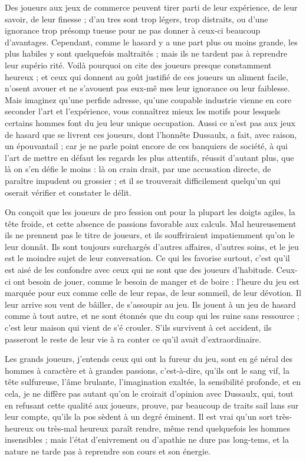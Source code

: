 Des joueurs aux jeux de commerce
peuvent tirer parti de leur expérience,
de leur savoir, de leur finesse ; d'au%
tres sont trop légers, trop distraits,
ou d'une ignorance trop présomp%
tueuse pour ne pas donner à ceux-ci
beaucoup d'avantages. Cependant,
comme le hasard y a une part plus ou
moins grande, les plus habiles y sont
quelquefois maltraités ; mais ils ne
tardent pas à reprendre leur supério%
rité. Voilà pourquoi on cite des joueurs
presque constamment heureux ; et
ceux qui donnent au goût justifié de
ces joueurs un aliment facile, n'osent
avouer et ne s'avouent pas eux-mê%
mes leur ignorance ou leur faiblesse.
Mais imaginez qu'une perfide adresse,
qu'une coupable industrie vienne en%
core seconder l'art et l'expérience,
vous connaîtrez mieux les motifs pour
lesquels certains hommes font du jeu
leur unique occupation. Aussi ce n'est
pas aux jeux de hasard que se livrent
ces joueurs, dont l'honnête Dussaulx,
a fait, avec raison, un épouvantail ;
car je ne parle point encore de ces
banquiers de société, à qui l'art de
mettre en défaut les regards les plus
attentifs, réussit d'autant plus, que
là on s'en défie le moins : là on crain%
drait, par une accusation directe, de
paraître impudent ou grossier ; et il se
trouverait difficilement quelqu'un qui
oserait vérifier et constater le délit.

On conçoit que les joueurs de pro%
fession ont pour la plupart les doigts
agiles, la tête froide, et cette absence
de passions favorable aux calculs. Mal%
heureusement ils ne prennent pas le
titre de joueurs, et ils souffriraient
impatiemment qu'on le leur donnât.
Ils sont toujours surchargés d'autres
affaires, d'autres soins, et le jeu est
le moindre sujet de leur conversation.
Ce qui les favorise surtout, c'est qu'il
est aisé de les confondre avec ceux qui
ne sont que des joueurs d'habitude.
Ceux-ci ont besoin de jouer, comme le
besoin de manger et de boire : l'heure
du jeu est marquée pour eux comme
celle de leur repas, de leur sommeil,
de leur dévotion. Il leur arrive sou%
vent de bâiller, de s'assoupir au jeu.
Ils jouent à un jeu de hasard comme
à tout autre, et ne sont étonnés que
du coup qui les ruine sans ressource ;
c'est leur maison qui vient de s'é%
crouler. S'ils survivent à cet accident,
ils passeront le reste de leur vie à ra%
conter ce qu'il avait d'extraordinaire.

Les grands joueurs, j'entends ceux
qui ont la fureur du jeu, sont en gé%
néral des hommes à caractère et à
grandes passions, c'est-à-dire, qu'ils
ont le sang vif, la tête sulfureuse,
l'âme brulante, l'imagination exaltée,
la sensibilité profonde, et en cela, je
ne diffère pas autant qu'on le croirait
d'opinion avec Dussaulx, qui, tout
en refusant cette qualité aux joueurs,
prouve, par beaucoup de traits sail%
lans sur leur compte, qu'ils la pos%
sèdent à un degré éminent. Il est vrai
qu'un sort très-heureux ou très-mal%
heureux paraît rendre, même rend
quelquefois les hommes insensibles ;
mais l'état d'enivrement ou d'apathie
ne dure pas long-tems, et la nature
ne tarde pas à reprendre son cours et
son énergie.

